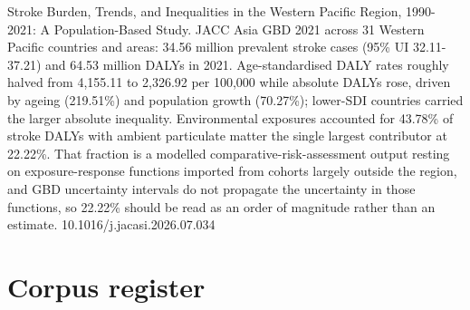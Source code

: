 \documentclass[10pt]{article}
\begin{document}
{Stroke Burden, Trends, and Inequalities in the Western Pacific Region, 1990-2021: A Population-Based Study.}
{JACC Asia}
{GBD 2021 across 31 Western Pacific countries and areas: 34.56 million prevalent stroke cases (95\% UI 32.11-37.21) and 64.53 million DALYs in 2021. Age-standardised DALY rates roughly halved from 4,155.11 to 2,326.92 per 100,000 while absolute DALYs rose, driven by ageing (219.51\%) and population growth (70.27\%); lower-SDI countries carried the larger absolute inequality. Environmental exposures accounted for 43.78\% of stroke DALYs with ambient particulate matter the single largest contributor at 22.22\%. That fraction is a modelled comparative-risk-assessment output resting on exposure-response functions imported from cohorts largely outside the region, and GBD uncertainty intervals do not propagate the uncertainty in those functions, so 22.22\% should be read as an order of magnitude rather than an estimate.}
{10.1016/j.jacasi.2026.07.034}

\clearpage

\section*{\sffamily\bfseries\color{Deep}Corpus register}
\vspace{-1.5mm}{\color{Amber}\rule{\linewidth}{1.1pt}}\vspace{2.5mm}


\end{document}

